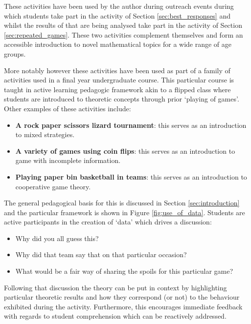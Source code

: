 \documentclass[12pt, a4paper]{article}
\begin{document}
These activities have been used by the author during outreach events during
which students take part in the activity of Section \ref{sec:best_responses} and
whilst the results of that are being analysed take part in the activity of
Section \ref{sec:repeated_games}. These two activities complement themselves and
form an accessible introduction to novel mathematical topics for a wide range of
age groups.

More notably however these activities have been used as part of a family of
activities used in a final year undergraduate course. This particular course is
taught in active learning pedagogic framework akin to a flipped class where
students are introduced to theoretic concepts through prior `playing of games'.
Other examples of these activities include:

\begin{itemize}
    \item \textbf{A rock paper scissors lizard tournament}: this serves as an
        introduction to mixed strategies.
    \item \textbf{A variety of games using coin flips}: this serves as an
        introduction to game with incomplete information.
    \item \textbf{Playing paper bin basketball in teams}: this serves as an
        introduction to cooperative game theory.
\end{itemize}

The general pedagogical basis for this is discussed in Section
\ref{sec:introduction} and the particular framework is shown in Figure
\ref{fig:use_of_data}. Students are active participants in the creation of
`data' which drives a discussion:

\begin{itemize}
    \item Why did you all guess this?
    \item Why did that team say that on that particular occasion?
    \item What would be a fair way of sharing the spoils for this particular
        game?
\end{itemize}

Following that discussion the theory can be put in context by highlighting
particular theoretic results and how they correspond (or not) to the behaviour
exhibited during the activity. Furthermore, this encourages immediate
feedback with regards to student comprehension which can be reactively
addressed.
\end{document}
